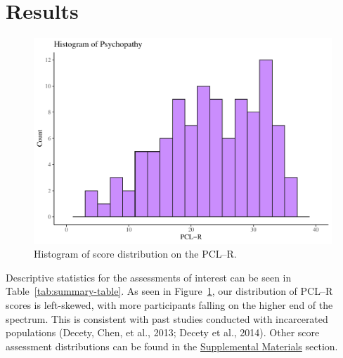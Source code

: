 \documentclass[
  man,floatsintext]{apa7}
\begin{document}
\hypertarget{results}{%
\section{Results}\label{results}}



\begin{figure}
\includegraphics[width=1\linewidth]{HalversonAnnaliseMAPSSThesis2024_files/figure-latex/PCLR-descriptives-1} \caption{Histogram of score distribution on the PCL--R.}\label{fig:PCLR-descriptives}
\end{figure}

Descriptive statistics for the assessments of interest can be seen in Table~\ref{tab:summary-table}. As seen in Figure~\ref{fig:PCLR-descriptives}, our distribution of PCL--R scores is left-skewed, with more participants falling on the higher end of the spectrum. This is consistent with past studies conducted with incarcerated populations (Decety, Chen, et al., 2013; Decety et al., 2014). Other score assessment distributions can be found in the \protect\hyperlink{Supplemental-Materials}{Supplemental Materials} section.
\end{document}
